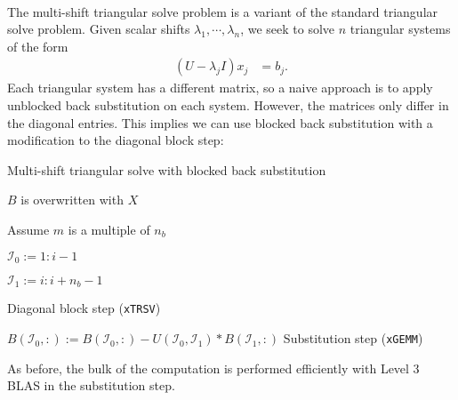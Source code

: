 \documentclass{article}
\begin{document}
\paragraph{}
The multi-shift triangular solve problem is a variant of the standard
triangular solve problem. Given scalar shifts
\(\lambda_1,\cdots,\lambda_n\),
we seek to solve \(n\) triangular systems of the form
\begin{align}
  \left(U-\lambda_j I\right) x_j &= b_j.
\end{align}
Each triangular system has a different matrix, so a naive approach is
to apply unblocked back substitution on each system. However, the
matrices only differ in the diagonal entries. This implies we can use
blocked back substitution with a modification to the diagonal block
step:
\begin{algorithm}[H]
  \label{algorithm:multi-shift trsm}
  \caption{Multi-shift triangular solve with blocked back substitution}
  \begin{algorithmic}
    \Comment \(B\) is overwritten with \(X\)

     \Comment Assume \(m\) is a multiple of
    \(n_b\)

    \State \( \mathcal{I}_0 := 1:i-1 \)

    \State \( \mathcal{I}_1 := i:i+n_b-1\)
    

    \State {} 
    \Comment Diagonal block step (\texttt{xTRSV})

    \EndFor

    \State \( B(\mathcal{I}_0,:) := B(\mathcal{I}_0,:) - U(\mathcal{I}_0,\mathcal{I}_1) * B(\mathcal{I}_1,:) \)
    \Comment Substitution step (\texttt{xGEMM})

    \EndFor

    \EndProcedure
  \end{algorithmic}
\end{algorithm}
\noindent
As before, the bulk of the computation is performed efficiently with
Level 3 BLAS in the substitution step.
\end{document}
